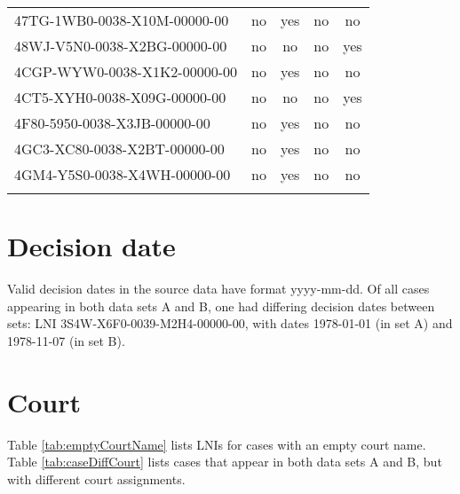 \documentclass[10pt, letterpaper]{article}
\begin{document}
\begin{spacing}{1.0}
\begin{table}[H]
\begin{tabular}{lcccc}
        47TG-1WB0-0038-X10M-00000-00 & no & yes & no & no\\
        48WJ-V5N0-0038-X2BG-00000-00 & no & no & no & yes\\
        4CGP-WYW0-0038-X1K2-00000-00 & no & yes & no & no\\
        4CT5-XYH0-0038-X09G-00000-00 & no & no & no & yes\\
        4F80-5950-0038-X3JB-00000-00 & no & yes & no & no\\
        4GC3-XC80-0038-X2BT-00000-00 & no & yes & no & no\\
        4GM4-Y5S0-0038-X4WH-00000-00 & no & yes & no & no\\[6pt]
        \hline\\
    \end{tabular}
    \label{tab:diffCaseType}
\end{table}


\clearpage

\section{Decision date}

Valid decision dates in the source data have format yyyy-mm-dd.  Of all cases appearing in both data sets A and B, one had differing decision dates between sets: LNI 3S4W-X6F0-0039-M2H4-00000-00, with dates 1978-01-01 (in set A) and 1978-11-07 (in set B).


\clearpage

\section{Court}

Table \ref{tab:emptyCourtName} lists LNIs for cases with an empty court name.  Table \ref{tab:caseDiffCourt} lists cases that appear in both data sets A and B, but with different court assignments.\\



\end{spacing}
\end{document}
